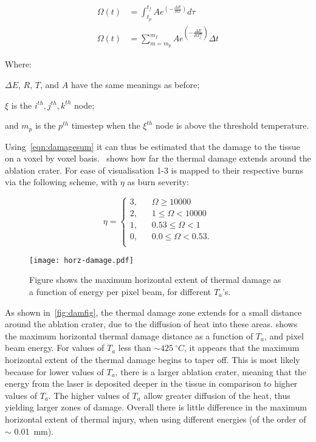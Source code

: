 \begin{align}
\Omega(t) &= \int^{t_{f}}_{t_p} Ae^{(-\tfrac{\Delta E}{RT})}d\tau \\
\Omega(t) &= \sum_{m=m_p}^{m_f} Ae^{(-\tfrac{\Delta E}{RT_{\xi}^{m}})}\Delta t\label{eqn:damagesum}
\end{align}
 
\noindent Where: 
	
	\indent $\Delta E$, $R$, $T$, and $A$ have the same meanings as before;
	
	\indent $\xi$ is the $i^{th}, j^{th}, k^{th}$ node;
	
	\indent and $m_p$ is the $p^{th}$ timestep when the $\xi^{th}$ node is above the threshold temperature.

	\medskip
	
	Using~\cref{eqn:damagesum} it can thus be estimated that the damage to the tissue on a voxel by voxel basis.~ shows how far the thermal damage extends around the ablation crater. For ease of visualisation 1-3 is mapped to their respective burns via the following scheme, with $\eta$ as burn severity:
	
\begin{equation}
\eta = 
     \begin{cases}
       \text{3,} &\quad \Omega \geq 10000\\
       \text{2,} &\quad 1 \leq \Omega < 10000\\
       \text{1,} &\quad 0.53 \leq \Omega < 1\\
       \text{0,} &\quad 0.0 \leq \Omega< 0.53.\\
     \end{cases}
\label{eqn:thermalbound}
\end{equation}

\begin{figure}[!htbp]
	\centering
	\texttt{[image: horz-damage.pdf]}
	\caption{Figure shows the maximum horizontal extent of thermal damage as a function of energy per pixel beam, for different $T_a$'s.}
	\label{fig:horz-70}
\end{figure}
	
As shown in~\cref{fig:damfig}, the thermal damage zone extends for a small distance around the ablation crater, due to the diffusion of heat into these areas.  shows the maximum horizontal thermal damage distance as a function of $T_a$, and pixel beam energy. For values of $T_a$ less than $\sim 425~^{\circ}C$, it appears that the maximum horizontal extent of the thermal damage begins to taper off. This is most likely because for lower values of $T_a$, there is a larger ablation crater, meaning that the energy from the laser is deposited deeper in the tissue in comparison to higher values of $T_a$. The higher values of $T_a$ allow greater diffusion of the heat, thus yielding larger zones of damage. Overall there is little difference in the maximum horizontal extent of thermal injury, when using different energies (of the order of $\sim$ 0.01~mm).



